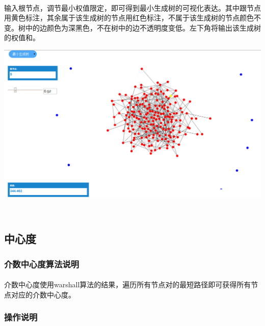 \documentclass{article}
\begin{document}
\begin{CJK}{UTF8}{gkai}
			\paragraph{}
			输入根节点，调节最小权值限定，即可得到最小生成树的可视化表达。其中跟节点用黄色标注，其余属于该生成树的节点用红色标注，不属于该生成树的节点颜色不变。树中的边颜色为深黑色，不在树中的边不透明度变低。左下角将输出该生成树的权值和。
		\\[\intextsep] 
		\begin{minipage}{\textwidth} 
		    \centering 
		    \includegraphics[width=0.9\linewidth]{mst.PNG}
		\end{minipage} 
		\\[\intextsep] 	

	\subsection{中心度}
		\subsubsection{介数中心度算法说明} %
			\paragraph{}
			介数中心度使用warshall算法的结果，遍历所有节点对的最短路径即可获得所有节点对应的介数中心度。
		\subsubsection{操作说明} %

\end{CJK}
\end{document}
